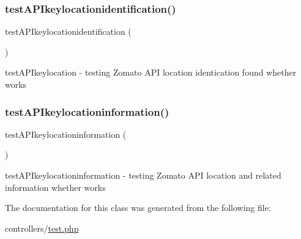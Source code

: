 \subsubsection{\texorpdfstring{test\+A\+P\+Ikeylocationidentification()}{testAPIkeylocationidentification()}}
{\footnotesize\ttfamily test\+A\+P\+Ikeylocationidentification (\begin{DoxyParamCaption}{ }\end{DoxyParamCaption})}

test\+A\+P\+Ikeylocation -\/ testing Zomato A\+PI location identication found whether works\mbox{\label{class_t_d_d_d27_testing_ab0a2313acbb42c73e5b9f1f217f708a2}} 
\subsubsection{\texorpdfstring{test\+A\+P\+Ikeylocationinformation()}{testAPIkeylocationinformation()}}
{\footnotesize\ttfamily test\+A\+P\+Ikeylocationinformation (\begin{DoxyParamCaption}{ }\end{DoxyParamCaption})}

test\+A\+P\+Ikeylocationinformation -\/ testing Zomato A\+PI location and related information whether works

The documentation for this class was generated from the following file\+:\begin{DoxyCompactItemize}
\item 
controllers/\mbox{\hyperlink{test_8php}{test.\+php}}\end{DoxyCompactItemize}
